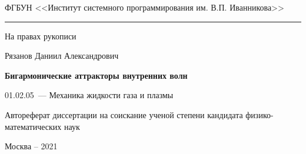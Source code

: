 \documentclass[utf8x]{G7-32} %
\begin{document}
\thispagestyle{empty}
\pagestyle{fancy}
\fancyhf{}
\fancyhead[C]{\thepage}
\renewcommand{\headrulewidth}{0pt}
{
\singlespacing
\begin{center}

ФГБУН <<Институт системного программирования им. В.П. Иванникова>>
\medskip
\hrule
\medskip
\end{center}

\vspace{20mm}
\begin{flushright}
На правах рукописи

\end{flushright}

\vspace{25mm}
\begin{center}
{\large Рязанов Даниил Александрович}
\end{center}

\vspace{5mm}
\begin{center}
{\bf \large Бигармонические аттракторы внутренних волн 
\par}

\vspace{10mm}
{
01.02.05~--- Механика жидкости газа и плазмы
}





\vspace{10mm}
Автореферат диссертации на соискание ученой степени кандидата физико-математических наук
\end{center}



\vfill
\begin{center}
{Москва -- 2021}
\end{center}
}
\newpage
\restoregeometry
\end{document}
